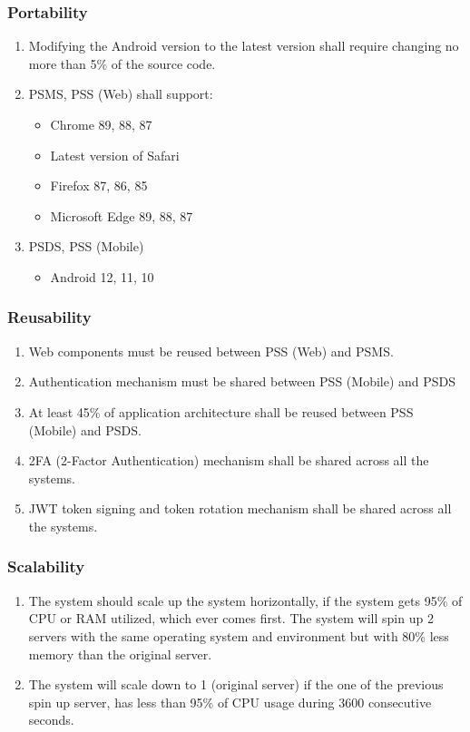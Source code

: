 \subsubsection{Portability}
\begin{enumerate}[label=POR-\arabic*]
    \item Modifying the Android version to the latest version shall require 
    changing no more than 5\% of the source code.
    \item PSMS, PSS (Web) shall support:
    \begin{itemize}
        \item Chrome 89, 88, 87
        \item Latest version of Safari
        \item Firefox 87, 86, 85
        \item Microsoft Edge 89, 88, 87
    \end{itemize}
    \item PSDS, PSS (Mobile)
    \begin{itemize}
        \item Android 12, 11, 10
    \end{itemize}
\end{enumerate}
\pagebreak
\subsubsection{Reusability}
\begin{enumerate}[label=REU-\arabic*]
    \item Web components must be reused between PSS (Web) and PSMS.
    \item Authentication mechanism must be shared between PSS (Mobile) and PSDS
    \item At least 45\% of application architecture shall be reused 
    between PSS (Mobile) and PSDS.
    \item 2FA (2-Factor Authentication) mechanism shall be shared across 
    all the systems.
    \item JWT token signing and token rotation mechanism shall be shared 
    across all the systems.
\end{enumerate}

\subsubsection{Scalability}
\begin{enumerate}[label=SCA-\arabic*]
    \item The system should scale up the system horizontally, if the system 
    gets 95\% of CPU or RAM utilized, which ever comes first. The system will 
    spin up 2 servers with the same operating system and environment 
    but with 80\% less memory than the original server.
    \item The system will scale down to 1 (original server) if the one of the 
    previous spin up server, has less than 95\% of CPU usage during 3600 
    consecutive seconds.
\end{enumerate}

